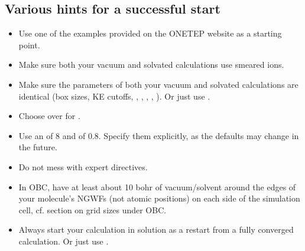 \documentclass[letterpaper,10pt,english]{sphinxmanual}
\begin{document}
\subsection{Various hints for a successful start}
\label{\detokenize{implicit_solvation_v3:various-hints-for-a-successful-start}}\begin{itemize}
\item {} 
Use one of the examples provided on the ONETEP website as a starting
point.

\item {} 
Make sure both your vacuum and solvated calculations use smeared
ions.

\item {} 
Make sure the parameters of both your vacuum and solvated
calculations are identical (box sizes, KE cutoffs, ,
, ,
, ). Or just use
.

\item {} 
Choose  over  for
.

\item {} 
Use an  of 8 and  of
0.8. Specify them explicitly, as the defaults may change in the
future.

\item {} 
Do not mess with expert directives.

\item {} 
In OBC, have at least about 10 bohr of vacuum/solvent around the
edges of your molecule’s NGWFs (not atomic positions) on each side of
the simulation cell,  \textendash{}
cf. section on grid sizes under OBC.

\item {} 
Always start your calculation in solution as a restart from a fully
converged  calculation. Or just use
.

\end{itemize}
\end{document}
